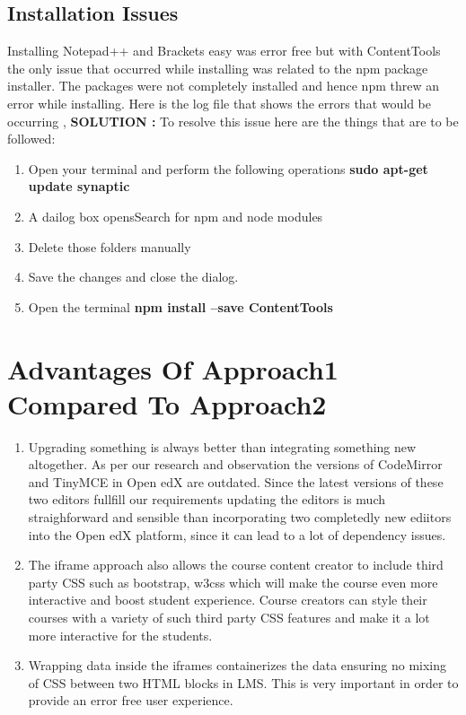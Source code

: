 \subsection{Installation Issues}
Installing Notepad++ and Brackets easy was error free but with ContentTools the only issue
that occurred while installing was related to the npm package installer. \newline
The packages were not completely installed and hence npm threw an error while
installing. \newline \newline
Here is the log file that shows the errors that would be occurring , 
\newline 
\newline
\textbf{SOLUTION :} To resolve this issue here are the things that are to be followed: \newline
\begin{enumerate}
\item Open your terminal and perform the following operations \newline
 \textbf
{sudo apt-get update
synaptic}
\item A dailog box opensSearch for npm and node modules
\item Delete those folders manually
\item Save the changes and close the dialog.
\item Open the terminal \newline
 \textbf
{npm install --save ContentTools}

\end{enumerate}
\section{Advantages Of Approach1 Compared To Approach2}
\begin{enumerate}
\item Upgrading something is always better than integrating something new altogether. As per
our research and observation the versions of CodeMirror and TinyMCE in Open edX are
outdated. Since the latest versions of these two editors fullfill our requirements updating the
editors is much straighforward and sensible than incorporating two completedly new ediitors
into the Open edX platform, since it can lead to a lot of dependency issues.
\item The iframe approach also allows the course content creator to include third party CSS
such as bootstrap, w3css which will make the course even more interactive and boost
student experience. Course creators can style their courses with a variety of such third party
CSS features and make it a lot more interactive for the students.
\item Wrapping data inside the iframes containerizes the data ensuring no mixing of CSS
between two HTML blocks in LMS. This is very important in order to provide an error free
user experience.
\end{enumerate}
